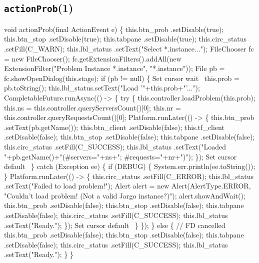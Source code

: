 \subsection{\texttt{actionProb}(1)}
\nwenddocs{}\endmoddef{}
void actionProb(final ActionEvent e) \{
  this.btn_prob     .setDisable(true);
  this.btn_stop     .setDisable(true);
  this.tabpane      .setDisable(true);
  this.circ_status  .setFill(C_WARN);
  this.lbl_status   .setText("Select *.instance...");
  FileChooser fc = new FileChooser();
  fc.getExtensionFilters().addAll(new ExtensionFilter("Problem Instance *.instance", "*.instance"));
  File pb = fc.showOpenDialog(this.stage);
  if (pb != null) \{
    \LA{}Set cursor wait~{\nwtagstyle{}}\RA{}
    this.prob = pb.toString();
    this.lbl_status.setText("Load '"+this.prob+"'...");
    CompletableFuture.runAsync(() -> \{
      try \{
        this.controller.loadProblem(this.prob);
        this.ns = this.controller.queryServersCount()[0];
        this.nr = this.controller.queryRequestsCount()[0];
        Platform.runLater(() -> \{
          this.btn_prob     .setText(pb.getName());
          this.btn_client   .setDisable(false);
          this.tf_client    .setDisable(false);
          this.btn_stop     .setDisable(false);
          this.tabpane      .setDisable(false);
          this.circ_status  .setFill(C_SUCCESS);
          this.lbl_status   .setText("Loaded "+pb.getName()+"(#servers="+ns+"; #requests="+nr+")");
        \});
        \LA{}Set cursor default~{\nwtagstyle{}}\RA{}
      \} catch (Exception ee) \{
        if (DEBUG) \{
          System.err.println(ee.toString());
        \}
        Platform.runLater(() -> \{
          this.circ_status  .setFill(C_ERROR);
          this.lbl_status   .setText("Failed to load problem!");
          Alert alert = new Alert(AlertType.ERROR, "Couldn't load problem! (Not a valid Jargo instance?)");
          alert.showAndWait();
          this.btn_prob     .setDisable(false);
          this.btn_stop     .setDisable(false);
          this.tabpane      .setDisable(false);
          this.circ_status  .setFill(C_SUCCESS);
          this.lbl_status   .setText("Ready.");
        \});
        \LA{}Set cursor default~{\nwtagstyle{}}\RA{}
      \}
    \});
  \} else \{
    // FD cancelled
    this.btn_prob     .setDisable(false);
    this.btn_stop     .setDisable(false);
    this.tabpane      .setDisable(false);
    this.circ_status  .setFill(C_SUCCESS);
    this.lbl_status   .setText("Ready.");
  \}
\}
\nwendcode{}\nwdocspar

